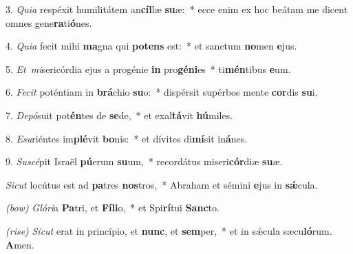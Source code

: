 3. \textit{Quia} respéxit humilitátem an\textbf{cíl}læ \textbf{su}æ:~*
	ecce enim ex hoc beátam me dicent omnes gene\textbf{ra}ti\textbf{ó}nes.

4. \textit{Quia} fecit mihi \textbf{ma}gna qui \textbf{pot}\textbf{ens} est:~*
	et sanctum \textbf{no}men \textbf{e}jus.

5. \textit{Et\ mi}sericórdia ejus a progénie \textbf{in} pro\textbf{gé}\textbf{ni}es~*
	ti\textbf{mén}tibus \textbf{e}um.

6. \textit{Fecit} poténtiam in \textbf{brá}chio \textbf{su}o:~*
	dispérsit supérbos mente \textbf{cor}dis \textbf{su}i.

7. \textit{Depó}suit pot\textbf{én}tes de \textbf{se}de,~*
	et exal\textbf{tá}vit \textbf{hú}miles.

8. \textit{Esu}riéntes im\textbf{plé}vit \textbf{bo}nis:~*
	et dívites di\textbf{mí}sit in\textbf{á}nes.

9. \textit{Suscé}pit Israël \textbf{pú}erum \textbf{su}um,~*
	recordátus miseri\textbf{cór}diæ \textbf{su}æ.

\textit{Sicut} locútus est ad \textbf{pa}tres \textbf{nos}tros,~*
	Abraham et sémini \textbf{e}jus in \textbf{s\'{\ae}}cula.

\textit{(bow)} \textit{Glóri}a \textbf{Pa}tri, et \textbf{Fí}\textbf{li}o,~*
	et Spi\textbf{rí}tui \textbf{Sanc}to.

\textit{(rise)} \textit{Sicut} erat in princípio, et \textbf{nunc}, et \textbf{sem}per,~*
	et in s\'{\ae}cula sæcu\textbf{ló}rum. \textbf{A}men.